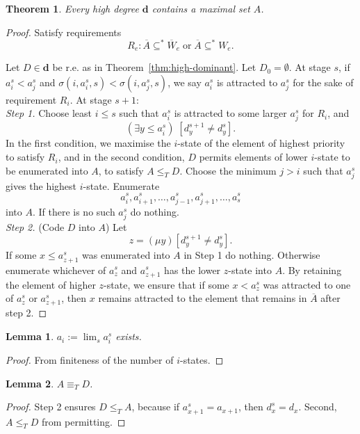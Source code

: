 \documentclass{article}
\newtheorem{lemma}{Lemma}[subsection]
\newtheorem{theorem}{Theorem}[subsection]
\begin{document}
  \begin{theorem}
    Every high degree $\bm{d}$ contains a maximal set $A$.
  \end{theorem}
  \begin{proof}
    Satisfy requirements
    \[R_e: \overline{A} \subseteq^* \overline{W}_e\; \text{or}\;
    \overline{A} \subseteq^* W_e.\]

    Let $D\in\bm{d}$ be r.e. as in Theorem~\ref{thm:high-dominant}. Let
    $D_0=\emptyset$. At stage $s$, if $a_i^s<a_j^s$ and $\sigma(i,a_i^s,s)
    <\sigma(i,a_j^s,s)$, we say $a_i^s$ is attracted to $a_j^s$ for the
    sake of requirement $R_i$. At stage $s+1$: \\

    \textit{Step 1.} Choose least $i\leq s$ such that
    $a_i^s$ is attracted to some larger $a_j^s$ for $R_i$, and
    \[(\exists y\leq a_i^s)\; [d_y^{s+1} \neq d_y^s].\]
    In the first condition, we maximise the $i$-state of the element of
    highest priority to satisfy $R_i$, and in the second condition, $D$
    permits elements of lower $i$-state to be enumerated into $A$, to
    satisfy $A\leq_T D$. Choose the minimum $j>i$ such that $a_j^s$ gives
    the highest $i$-state. Enumerate
    \[a_i^s, a_{i+1}^s, \ldots, a_{j-1}^s, a_{j+1}^s, \ldots, a_s^s\]
    into $A$. If there is no such $a_j^s$ do nothing. \\

    \textit{Step 2.} (Code $D$ into $A$) Let
    \[z =(\mu y) [d_y^{s+1} \neq d_y^s].\]
    If some $x\leq a_{z+1}^s$ was enumerated into $A$ in Step 1 do nothing.
    Otherwise enumerate whichever of $a_z^s$ and $a_{z+1}^s$ has the lower
    $z$-state into $A$. By retaining the element of higher $z$-state, we
    ensure that if some $x<a_z^s$ was attracted to one of $a_z^s$ or
    $a_{z+1}^s$, then $x$ remains attracted to the element that remains in
    $\overline{A}$ after step 2.
  \end{proof}

  \begin{lemma}
    $a_i :=\lim_s a_i^s$ exists.
  \end{lemma}
  \begin{proof}
    From finiteness of the number of $i$-states.
  \end{proof}

  \begin{lemma}
    $A\equiv_T D$.
  \end{lemma}
  \begin{proof}
    Step 2 ensures $D\leq_T A$, because if $a_{x+1}^s=a_{x+1}$, then
    $d_x^s=d_x$. Second, $A\leq_T D$ from permitting.
  \end{proof}
\end{document}
